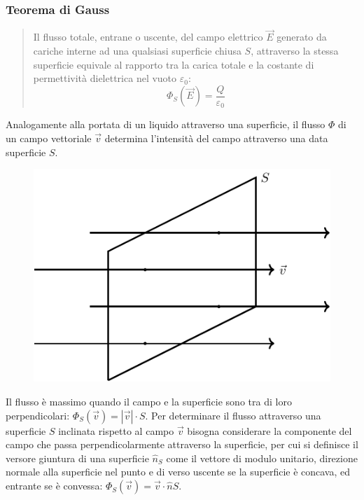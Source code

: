 \documentclass{article}
\numberwithin{equation}{subsection}
\begin{document}
\subsubsection{Teorema di Gauss}

\begin{quotation}
    Il flusso totale, entrane o uscente, del campo elettrico $\vec{E}$ generato da cariche interne ad una qualsiasi superficie chiusa $S$, attraverso 
    la stessa superficie equivale al rapporto tra la carica totale e la costante di permettività dielettrica nel vuoto $\varepsilon_0$:
    \begin{equation}
        \Phi_{S}(\vec{E})=\displaystyle\frac{Q}{\varepsilon_0}
    \end{equation}
\end{quotation}


Analogamente alla portata di un liquido attraverso una superficie, il flusso $\Phi$ di un campo vettoriale $\vec{v}$ determina l'intensità del campo attraverso una data superficie $S$. 
\begin{figure}[H]%
    \centering
    \includegraphics{flusso.pdf}
    \label{fig:flusso}
\end{figure}
Il flusso è massimo quando il campo e la superficie sono tra di loro perpendicolari: $\Phi_S(\vec{v})=|\vec{v}|\cdot S$. Per determinare il flusso attraverso una superficie $S$ 
inclinata rispetto al campo $\vec{v}$ bisogna considerare la componente del campo che passa perpendicolarmente attraverso la superficie, per cui si definisce il versore 
giuntura di una superficie $\hat{n}_S$ come il vettore di modulo unitario, direzione normale alla superficie nel punto e di verso uscente se la superficie è concava, ed 
entrante se è convessa: $\Phi_S(\vec{v})=\vec{v}\cdot\hat{n}S$. 
\end{document}
